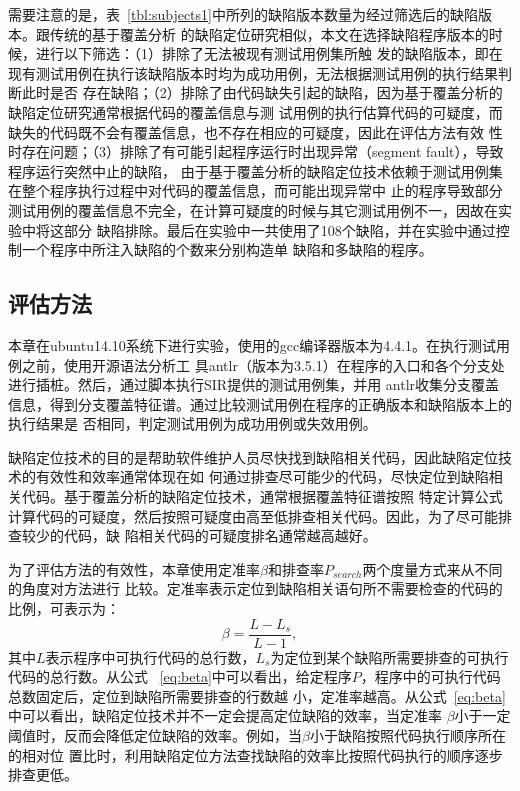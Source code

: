 需要注意的是，表~\ref{tbl:subjects1}中所列的缺陷版本数量为经过筛选后的缺陷版本。跟传统的基于覆盖分析
的缺陷定位研究相似，本文在选择缺陷程序版本的时候，进行以下筛选：（1）排除了无法被现有测试用例集所触
发的缺陷版本，即在现有测试用例在执行该缺陷版本时均为成功用例，无法根据测试用例的执行结果判断此时是否
存在缺陷；（2）排除了由代码缺失引起的缺陷，因为基于覆盖分析的缺陷定位研究通常根据代码的覆盖信息与测
试用例的执行估算代码的可疑度，而缺失的代码既不会有覆盖信息，也不存在相应的可疑度，因此在评估方法有效
性时存在问题；（3）排除了有可能引起程序运行时出现异常（segment fault），导致程序运行突然中止的缺陷，
由于基于覆盖分析的缺陷定位技术依赖于测试用例集在整个程序执行过程中对代码的覆盖信息，而可能出现异常中
止的程序导致部分测试用例的覆盖信息不完全，在计算可疑度的时候与其它测试用例不一，因故在实验中将这部分
缺陷排除。最后在实验中一共使用了108个缺陷，并在实验中通过控制一个程序中所注入缺陷的个数来分别构造单
缺陷和多缺陷的程序。

\subsection{评估方法}
本章在ubuntu14.10系统下进行实验，使用的gcc编译器版本为4.4.1。在执行测试用例之前，使用开源语法分析工
具antlr（版本为3.5.1）在程序的入口和各个分支处进行插桩。然后，通过脚本执行SIR提供的测试用例集，并用
antlr收集分支覆盖信息，得到分支覆盖特征谱。通过比较测试用例在程序的正确版本和缺陷版本上的执行结果是
否相同，判定测试用例为成功用例或失效用例。

缺陷定位技术的目的是帮助软件维护人员尽快找到缺陷相关代码，因此缺陷定位技术的有效性和效率通常体现在如
何通过排查尽可能少的代码，尽快定位到缺陷相关代码。基于覆盖分析的缺陷定位技术，通常根据覆盖特征谱按照
特定计算公式计算代码的可疑度，然后按照可疑度由高至低排查相关代码。因此，为了尽可能排查较少的代码，缺
陷相关代码的可疑度排名通常越高越好。

为了评估方法的有效性，本章使用定准率$\beta$和排查率$P_{search}$两个度量方式来从不同的角度对方法进行
比较。定准率表示定位到缺陷相关语句所不需要检查的代码的比例，可表示为：
\begin{equation}
       \beta = \frac{L-L_s}{L-1},\label{eq:beta}
\end{equation}
其中$L$表示程序中可执行代码的总行数，$L_s$为定位到某个缺陷所需要排查的可执行代码的总行数。从公式
~\ref{eq:beta}中可以看出，给定程序$P$，程序中的可执行代码总数固定后，定位到缺陷所需要排查的行数越
小，定准率越高。从公式~\ref{eq:beta}中可以看出，缺陷定位技术并不一定会提高定位缺陷的效率，当定准率
$\beta$小于一定阈值时，反而会降低定位缺陷的效率。例如，当$\beta$小于缺陷按照代码执行顺序所在的相对位
置比时，利用缺陷定位方法查找缺陷的效率比按照代码执行的顺序逐步排查更低。

